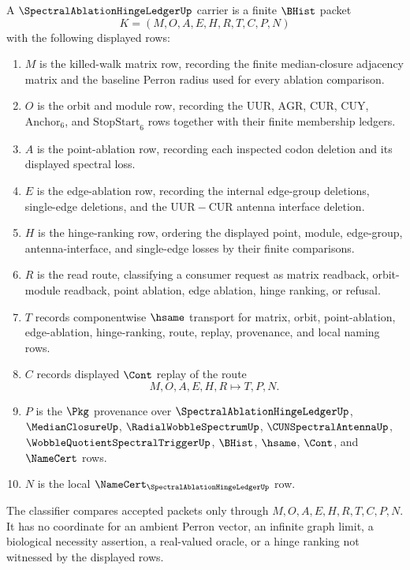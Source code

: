 \begin{definition}
\label{def:spectral-ablation-hinge-ledger-carrier}
A $\SpectralAblationHingeLedgerUp$ carrier is a finite $\BHist$ packet
$$
K=(M,O,A,E,H,R,T,C,P,N)
$$
with the following displayed rows:
\begin{enumerate}
\item $M$ is the killed-walk matrix row, recording the finite median-closure adjacency matrix and the baseline Perron radius used for every ablation comparison.
\item $O$ is the orbit and module row, recording the $\mathrm{UUR}$, $\mathrm{AGR}$, $\mathrm{CUR}$, $\mathrm{CUY}$, $\mathrm{Anchor}_{6}$, and $\mathrm{StopStart}_{6}$ rows together with their finite membership ledgers.
\item $A$ is the point-ablation row, recording each inspected codon deletion and its displayed spectral loss.
\item $E$ is the edge-ablation row, recording the internal edge-group deletions, single-edge deletions, and the $\mathrm{UUR}-\mathrm{CUR}$ antenna interface deletion.
\item $H$ is the hinge-ranking row, ordering the displayed point, module, edge-group, antenna-interface, and single-edge losses by their finite comparisons.
\item $R$ is the read route, classifying a consumer request as matrix readback, orbit-module readback, point ablation, edge ablation, hinge ranking, or refusal.
\item $T$ records componentwise $\hsame$ transport for matrix, orbit, point-ablation, edge-ablation, hinge-ranking, route, replay, provenance, and local naming rows.
\item $C$ records displayed $\Cont$ replay of the route
$$
M,O,A,E,H,R \longmapsto T,P,N .
$$
\item $P$ is the $\Pkg$ provenance over $\SpectralAblationHingeLedgerUp$, $\MedianClosureUp$, $\RadialWobbleSpectrumUp$, $\CUNSpectralAntennaUp$, $\WobbleQuotientSpectralTriggerUp$, $\BHist$, $\hsame$, $\Cont$, and $\NameCert$ rows.
\item $N$ is the local $\NameCert_{\SpectralAblationHingeLedgerUp}$ row.
\end{enumerate}
The classifier compares accepted packets only through $M,O,A,E,H,R,T,C,P,N$. It has no coordinate for an ambient Perron vector, an infinite graph limit, a biological necessity assertion, a real-valued oracle, or a hinge ranking not witnessed by the displayed rows.
\end{definition}

